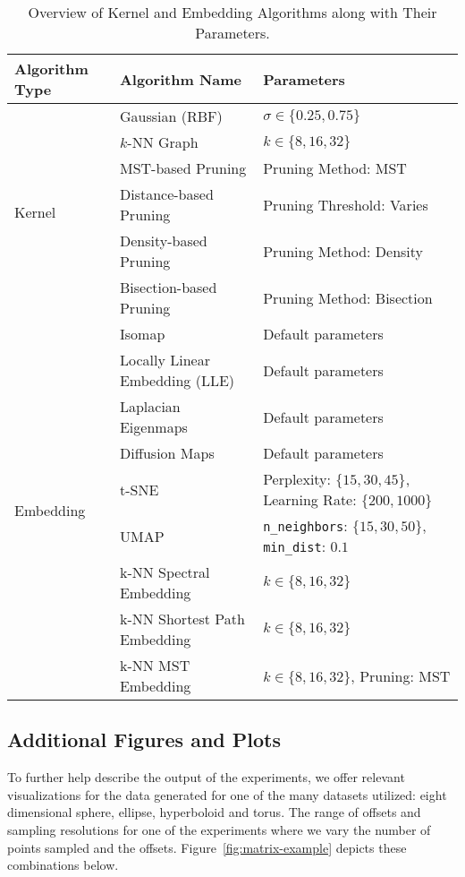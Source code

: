 \documentclass{article}
\theoremstyle{plain}
\theoremstyle{definition}
\theoremstyle{remark}
\begin{document}
\begin{table}[t]
\centering
\caption{Overview of Kernel and Embedding Algorithms along with Their Parameters.}
\label{tab:algorithms}
\begin{tabular}{lll}
\toprule
\textbf{Algorithm Type} & \textbf{Algorithm Name} & \textbf{Parameters} \\
\midrule
\multirow{6}{*}{Kernel} & Gaussian (RBF) & $\sigma \in \{0.25, 0.75\}$ \\
& $k$-NN Graph & $k \in \{8, 16, 32\}$ \\
& \quad MST-based Pruning & Pruning Method: MST \\
& \quad Distance-based Pruning & Pruning Threshold: Varies \\
& \quad Density-based Pruning & Pruning Method: Density \\
& \quad Bisection-based Pruning & Pruning Method: Bisection \\
\midrule
\multirow{10}{*}{Embedding} & Isomap & Default parameters \\
& Locally Linear Embedding (LLE) & Default parameters \\
& Laplacian Eigenmaps & Default parameters \\
& Diffusion Maps & Default parameters \\
& t-SNE & Perplexity: $\{15, 30, 45\}$, Learning Rate: $\{200, 1000\}$ \\
& UMAP & \texttt{n\_neighbors}: $\{15, 30, 50\}$, \texttt{min\_dist}: $0.1$ \\
& k-NN Spectral Embedding & $k \in \{8, 16, 32\}$ \\
& k-NN Shortest Path Embedding & $k \in \{8, 16, 32\}$ \\
& k-NN MST Embedding & $k \in \{8, 16, 32\}$, Pruning: MST \\
\bottomrule
\end{tabular}
\end{table}

\subsection{Additional Figures and Plots}
\label{app:figs}

To further help describe the output of the experiments, we offer relevant visualizations for the data generated for one of the many datasets utilized: eight dimensional sphere, ellipse, hyperboloid and torus. The range of offsets and sampling resolutions for one of the experiments where we vary the number of points sampled and the offsets. Figure~\ref{fig:matrix-example} depicts these combinations below.
\end{document}
